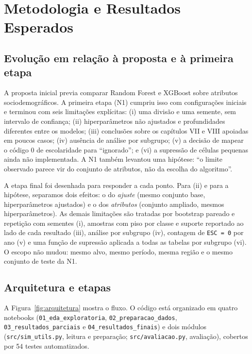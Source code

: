 \documentclass[12pt]{article}
\begin{document}
\section{Metodologia e Resultados Esperados}
\label{sec:metodologia}

\subsection{Evolução em relação à proposta e à primeira etapa}

A proposta inicial previa comparar Random Forest e XGBoost sobre atributos sociodemográficos. A primeira etapa (N1) cumpriu isso com configurações iniciais e terminou com seis limitações explícitas: (i) uma divisão e uma semente, sem intervalo de confiança; (ii) hiperparâmetros não ajustados e profundidades diferentes entre os modelos; (iii) conclusões sobre os capítulos VII e VIII apoiadas em poucos casos; (iv) ausência de análise por subgrupo; (v) a decisão de mapear o código 0 de escolaridade para ``ignorado''; e (vi) a supressão de células pequenas ainda não implementada. A N1 também levantou uma hipótese: ``o limite observado parece vir do conjunto de atributos, não da escolha do algoritmo''.

A etapa final foi desenhada para responder a cada ponto. Para (ii) e para a hipótese, separamos dois efeitos: o do \emph{ajuste} (mesmo conjunto base, hiperparâmetros ajustados) e o dos \emph{atributos} (conjunto ampliado, mesmos hiperparâmetros). As demais limitações são tratadas por bootstrap pareado e repetição com sementes (i), amostras com piso por classe e suporte reportado ao lado de cada resultado (iii), análise por subgrupo (iv), contagem de \texttt{ESC = 0} por ano (v) e uma função de supressão aplicada a todas as tabelas por subgrupo (vi). O escopo não mudou: mesmo alvo, mesmo período, mesma região e o mesmo conjunto de teste da N1.

\subsection{Arquitetura e etapas}

A Figura~\ref{fig:arquitetura} mostra o fluxo. O código está organizado em quatro notebooks (\texttt{01\_eda\_exploratoria}, \texttt{02\_preparacao\_dados}, \texttt{03\_resultados\_parciais} e \texttt{04\_resultados\_finais}) e dois módulos (\texttt{src/sim\_utils.py}, leitura e preparação; \texttt{src/avaliacao.py}, avaliação), cobertos por 54 testes automatizados.
\end{document}
